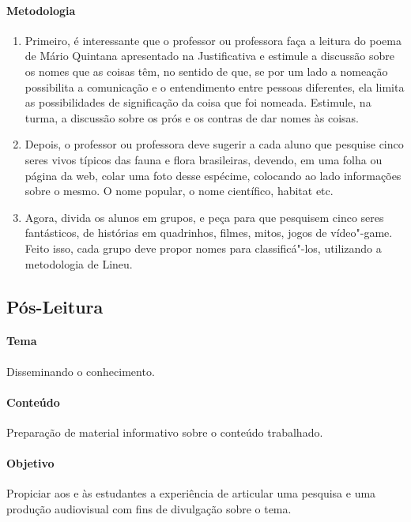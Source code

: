 \documentclass[12pt]{extarticle}
\begin{document}
\paragraph{Metodologia}

\begin{enumerate}

	\item
	Primeiro, é interessante que o professor ou professora faça a leitura do poema
	de Mário Quintana apresentado na Justificativa e estimule a discussão
	sobre os nomes que as coisas têm, no sentido de que, se por um lado
	a nomeação possibilita a comunicação e o entendimento entre pessoas
	diferentes, ela limita as possibilidades de significação da coisa que foi nomeada.
	Estimule, na turma, a discussão sobre os prós e os contras de dar nomes
	às coisas.

	\item
	Depois, o professor ou professora deve sugerir a cada aluno que pesquise cinco 
	seres vivos típicos das fauna e flora brasileiras, devendo, em uma folha ou 
	página da web, colar uma foto desse espécime, colocando ao lado informações sobre o 
	mesmo. O nome popular, o nome científico, habitat etc.

	\item
	Agora, divida os alunos em grupos, e peça para que pesquisem cinco
	seres fantásticos, de histórias em quadrinhos, filmes, mitos, jogos de
	vídeo"-game. Feito isso, cada grupo deve propor nomes para classificá"-los,
	utilizando a metodologia de Lineu.

\end{enumerate}




\subsection{Pós-Leitura}

\paragraph{Tema} Disseminando o conhecimento.

\paragraph{Conteúdo} Preparação de material informativo sobre o conteúdo trabalhado.

\paragraph{Objetivo} Propiciar aos e às estudantes a experiência de articular
uma pesquisa e uma produção audiovisual com fins de divulgação sobre o tema.
\end{document}
